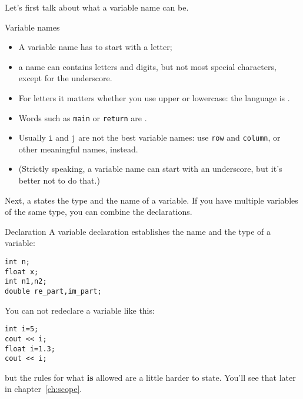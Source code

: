 Let's first talk about what a variable name can be.

\begin{block}{Variable names}
  \label{sl:varname}
  \begin{itemize}
  \item
    A variable name has to start with a letter;
  \item a name can contains letters and  digits, but not most
    special characters, except for the underscore.
  \item For letters it matters
    whether you use upper or lowercase: the language is .
  \item Words such as \lstinline{main} or \lstinline{return} are .
  \item Usually \lstinline{i} and \lstinline{j} are not the best variable names: use
    \lstinline{row} and \lstinline{column}, or other meaningful names, instead.
  \item (Strictly speaking, a variable name can start with an underscore,
    but it's better not to do that.)
  \end{itemize}
\end{block}


Next, a 
states the type and the name of a variable.
If you have multiple variables of the same type,
you can combine the declarations.

\begin{block}{Declaration}
  \label{sl:declare-example}
  A variable declaration establishes the name
  and the type of a variable:
\begin{lstlisting}
int n;
float x;
int n1,n2;
double re_part,im_part;
\end{lstlisting}
\end{block}

You can not redeclare a variable like this:
\begin{lstlisting}
int i=5;
cout << i;
float i=1.3;
cout << i;
\end{lstlisting}
but the rules for what \textbf{is} allowed are a little harder to state.
You'll see that later in chapter~\ref{ch:scope}.

